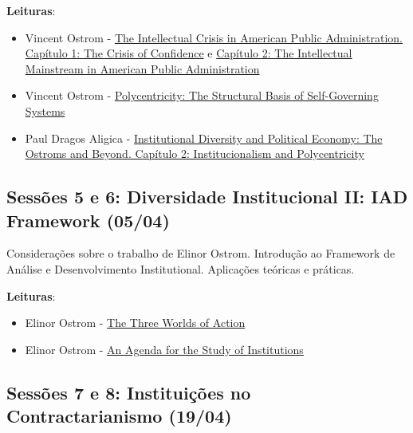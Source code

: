 \documentclass[12pt,]{article}
\providecommand{\tightlist}{%
  \setlength{\itemsep}{0pt}\setlength{\parskip}{0pt}}
\begin{document}
\textbf{Leituras}:

\begin{itemize}
\tightlist
\item
  Vincent Ostrom -
  \href{https://github.com/danilofreire/economia-politica-instituicoes-ufm/blob/master/sessoes-03-04/vicent-ostrom-01.pdf}{The
  Intellectual Crisis in American Public Administration. Capítulo 1: The
  Crisis of Confidence} e
  \href{https://github.com/danilofreire/economia-politica-instituicoes-ufm/blob/master/sessoes-03-04/vincent-ostrom-02.pdf}{Capítulo
  2: The Intellectual Mainstream in American Public Administration}
\item
  Vincent Ostrom -
  \href{https://github.com/danilofreire/economia-politica-instituicoes-ufm/blob/master/sessoes-03-04/vincent-ostrom-03.pdf}{Polycentricity:
  The Structural Basis of Self-Governing Systems}
\item
  Paul Dragos Aligica -
  \href{https://github.com/danilofreire/economia-politica-instituicoes-ufm/blob/master/sessoes-03-04/aligica.pdf}{Institutional
  Diversity and Political Economy: The Ostroms and Beyond. Capítulo 2:
  Institucionalism and Polycentricity}
\end{itemize}

\subsection{Sessões 5 e 6: Diversidade Institucional II: IAD Framework
(05/04)}\label{sessoes-5-e-6-diversidade-institucional-ii-iad-framework-0504}

Considerações sobre o trabalho de Elinor Ostrom. Introdução ao Framework
de Análise e Desenvolvimento Institutional. Aplicações teóricas e
práticas.

\textbf{Leituras}:

\begin{itemize}
\tightlist
\item
  Elinor Ostrom -
  \href{https://github.com/danilofreire/economia-politica-instituicoes-ufm/blob/master/sessoes-05-06/elinor-ostrom-01.pdf}{The
  Three Worlds of Action}
\item
  Elinor Ostrom -
  \href{https://github.com/danilofreire/economia-politica-instituicoes-ufm/blob/master/sessoes-05-06/elinor-ostrom-02.pdf}{An
  Agenda for the Study of Institutions}
\end{itemize}

\subsection{Sessões 7 e 8: Instituições no Contractarianismo
(19/04)}\label{sessoes-7-e-8-instituicoes-no-contractarianismo-1904}
\end{document}

